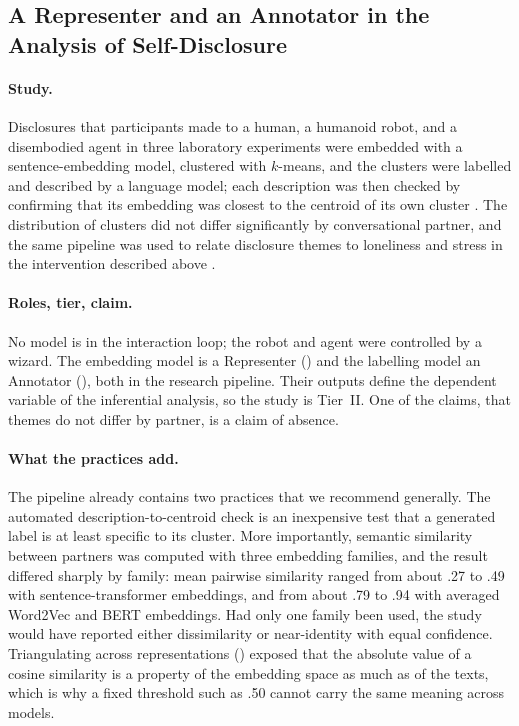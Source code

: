 \subsection{A Representer and an Annotator in the Analysis of Self-Disclosure}
\label{sec:exB}

\paragraph{Study.} Disclosures that participants made to a human, a humanoid
robot, and a disembodied agent in three laboratory experiments were embedded
with a sentence-embedding model, clustered with $k$-means, and the clusters
were labelled and described by a language model; each description was then
checked by confirming that its embedding was closest to the centroid of its
own cluster \cite{chiang2025selfdisclosure}. The distribution of clusters did
not differ significantly by conversational partner, and the same pipeline was
used to relate disclosure themes to loneliness and stress in the intervention
described above \cite{laban2025what}.

\paragraph{Roles, tier, claim.} No model is in the interaction loop; the
robot and agent were controlled by a wizard. The embedding model is a
Representer () and the labelling model an Annotator (), both
in the research pipeline. Their outputs define the dependent variable of the
inferential analysis, so the study is Tier~II. One of the claims, that themes
do not differ by partner, is a claim of absence.

\paragraph{What the practices add.} The pipeline already contains two
practices that we recommend generally. The automated description-to-centroid
check is an inexpensive test that a generated label is at least specific to
its cluster. More importantly, semantic similarity between partners was
computed with three embedding families, and the result differed sharply by
family: mean pairwise similarity ranged from about .27 to .49 with
sentence-transformer embeddings, and from about .79 to .94 with averaged
Word2Vec and BERT embeddings. Had only one family been used, the study would
have reported either dissimilarity or near-identity with equal confidence.
Triangulating across representations () exposed that the absolute
value of a cosine similarity is a property of the embedding space as much as
of the texts, which is why a fixed threshold such as .50 cannot carry the same
meaning across models.

